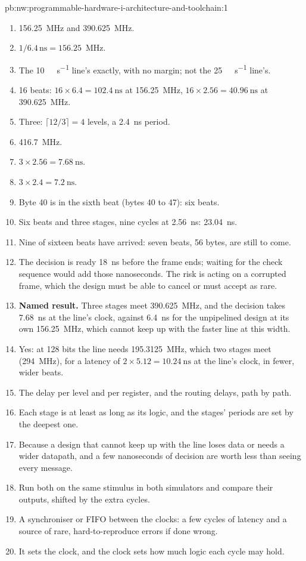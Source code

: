\begin{solution}{pb:nw:programmable-hardware-i-architecture-and-toolchain:1}
\begin{enumerate}
\item 156.25~MHz and 390.625~MHz.
\item $1/6.4\,\mathrm{ns} = 156.25$~MHz.
\item The \qty{10}{\giga\bit\per\second} line's exactly, with no margin; not the \qty{25}{\giga\bit\per\second} line's.
\item 16 beats: $16 \times 6.4 = \qty{102.4}{\nano\second}$ at 156.25~MHz, $16 \times 2.56 = \qty{40.96}{\nano\second}$ at 390.625~MHz.
\item Three: $\lceil 12/3\rceil = 4$ levels, a \qty{2.4}{\nano\second} period.
\item 416.7~MHz.
\item $3 \times 2.56 = \qty{7.68}{\nano\second}$.
\item $3 \times 2.4 = \qty{7.2}{\nano\second}$.
\item Byte 40 is in the sixth beat (bytes 40 to 47): six beats.
\item Six beats and three stages, nine cycles at \qty{2.56}{\nano\second}: \qty{23.04}{\nano\second}.
\item Nine of sixteen beats have arrived: seven beats, 56 bytes, are still to come.
\item The decision is ready \qty{18}{\nano\second} before the frame ends; waiting for the check sequence would add those nanoseconds. The risk is
  acting on a corrupted frame, which the design must be able to cancel or must accept as rare.
\item \textbf{Named result.} Three stages meet 390.625~MHz, and the decision takes \qty{7.68}{\nano\second} at the line's clock, against
  \qty{6.4}{\nano\second} for the unpipelined design at its own 156.25~MHz, which cannot keep up with the faster line at this width.
\item Yes: at 128 bits the line needs 195.3125~MHz, which two stages meet (294~MHz), for a latency of $2 \times 5.12 = \qty{10.24}{\nano\second}$ at
  the line's clock, in fewer, wider beats.
\item The delay per level and per register, and the routing delays, path by path.
\item Each stage is at least as long as its logic, and the stages' periods are set by the deepest one.
\item Because a design that cannot keep up with the line loses data or needs a wider datapath, and a few nanoseconds of decision are worth
  less than seeing every message.
\item Run both on the same stimulus in both simulators and compare their outputs, shifted by the extra cycles.
\item A synchroniser or FIFO between the clocks: a few cycles of latency and a source of rare, hard-to-reproduce errors if done wrong.
\item It sets the clock, and the clock sets how much logic each cycle may hold.
\end{enumerate}
\end{solution}

